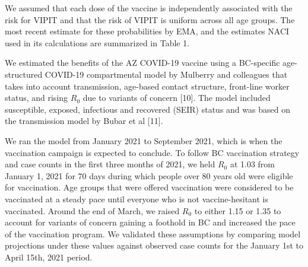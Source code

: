 \documentclass[]{elsarticle} %
\begin{document}
We assumed that each dose of the vaccine is independently associated
with the risk for VIPIT and that the risk of VIPIT is uniform across all
age groups. The most recent estimate for these probabilities by EMA, and
the estimates NACI used in its calculations are summarized in Table 1.

We estimated the benefits of the AZ COVID-19 vaccine using a BC-specific
age-structured COVID-19 compartmental model by Mulberry and colleagues
that takes into account transmission, age-based contact structure,
front-line worker status, and rising \(R_0\) due to variants of concern
{[}10{]}. The model included susceptible, exposed, infectious and
recovered (SEIR) status and was based on the transmission model by Bubar
et al {[}11{]}.

We ran the model from January 2021 to September 2021, which is when the
vaccination campaign is expected to conclude. To follow BC vaccination
strategy and case counts in the first three months of 2021, we held
\(R_0\) at 1.03 from January 1, 2021 for 70 days during which people
over 80 years old were eligible for vaccination. Age groups that were
offered vaccination were considered to be vaccinated at a steady pace
until everyone who is not vaccine-hesitant is vaccinated. Around the end
of March, we raised \(R_0\) to either 1.15 or 1.35 to account for
variants of concern gaining a foothold in BC and increased the pace of
the vaccination program. We validated these assumptions by comparing
model projections under these values against observed case counts for
the January 1st to April 15th, 2021 period.
\end{document}
